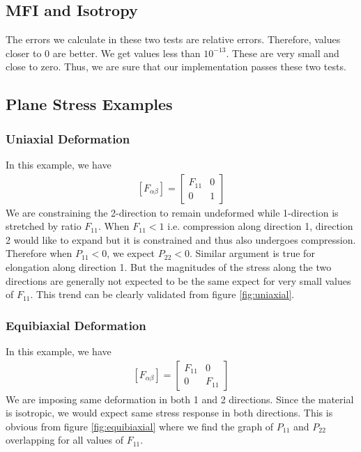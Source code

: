 \documentclass[../main.tex]{subfiles}
\begin{document}
\subsection{MFI and Isotropy}
The errors we calculate in these two tests are relative errors. Therefore, values closer to $0$ are better. We get values less than $10^{-13}$. These are very small and close to zero. Thus, we are sure that our implementation passes these two tests.

\subsection{Plane Stress Examples}
\subsubsection{Uniaxial Deformation}
In this example, we have
\begin{align*}
  \left[F_{\alpha\beta}\right] =   \begin{bmatrix}F_{11} & 0\\ 0 & 1 \end{bmatrix}
\end{align*}
We are constraining the 2-direction to remain undeformed while 1-direction is stretched by ratio $F_{11}$. When $F_{11} < 1$ i.e. compression along direction 1, direction 2 would like to expand but it is constrained and thus also undergoes compression. Therefore when $P_{11} < 0$, we expect $P_{22} < 0$. Similar argument is true for elongation along direction 1. But the magnitudes of the stress along the two directions are generally not expected to be the same expect for very small values of $F_{11}$. This trend can be clearly validated from figure \ref{fig:uniaxial}.

\subsubsection{Equibiaxial Deformation}
In this example, we have
\begin{align*}
  \left[F_{\alpha\beta}\right] =   \begin{bmatrix}F_{11} & 0\\ 0 & F_{11} \end{bmatrix}
\end{align*}
We are imposing same deformation in both 1 and 2 directions. Since the material is isotropic, we would expect same stress response in both directions. This is obvious from figure \ref{fig:equibiaxial} where we find the graph of $P_{11}$ and $P_{22}$ overlapping for all values of $F_{11}$.
\end{document}
